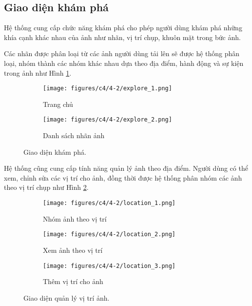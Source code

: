 \subsection{Giao diện khám phá}

Hệ thống cung cấp chức năng khám phá cho phép người dùng khám phá những khía cạnh khác nhau của ảnh như nhãn, vị trí chụp, khuôn mặt trong bức ảnh.

Các nhãn được phân loại từ các ảnh người dùng tải lên sẽ được hệ thống phân loại, nhóm thành các nhóm khác nhau dựa theo địa điểm, hành động và sự kiện trong ảnh như Hình \ref{fig:explore_label}.

\begin{figure}[H]
    \centering
    \begin{subfigure}{0.48\textwidth}
        \texttt{[image: figures/c4/4-2/explore\_1.png]} 
        \caption{Trang chủ}
    \end{subfigure}
    \hfill
    \begin{subfigure}{0.48\textwidth}
        \texttt{[image: figures/c4/4-2/explore\_2.png]} 
        \caption{Danh sách nhãn ảnh}
    \end{subfigure}
    \caption{Giao diện khám phá.}
    \label{fig:explore_label}
\end{figure}

Hệ thống cũng cung cấp tính năng quản lý ảnh theo địa điểm. Người dùng có thể xem, chỉnh sửa các vị trí cho ảnh, đồng thời được hệ thống phân nhóm các ảnh theo vị trí chụp như Hình \ref{fig:explore_location}.

\begin{figure}[H]
    \centering
    \begin{subfigure}{0.32\textwidth}
        \texttt{[image: figures/c4/4-2/location\_1.png]} 
        \caption{Nhóm ảnh theo vị trí}
    \end{subfigure}
    \hfill
    \begin{subfigure}{0.32\textwidth}
        \texttt{[image: figures/c4/4-2/location\_2.png]} 
        \caption{Xem ảnh theo vị trí}
    \end{subfigure}
    \hfill
    \begin{subfigure}{0.32\textwidth}
        \texttt{[image: figures/c4/4-2/location\_3.png]} 
        \caption{Thêm vị trí cho ảnh}
    \end{subfigure}
    \caption{Giao diện quản lý vị trí ảnh.}
    \label{fig:explore_location}
\end{figure}

